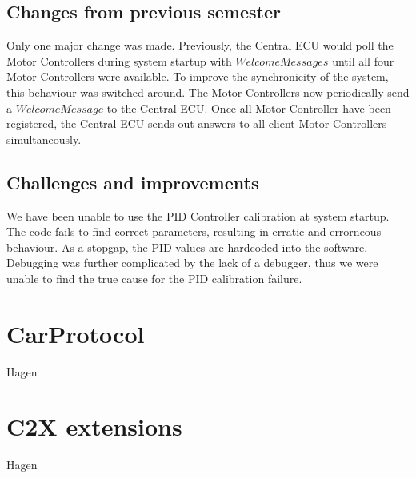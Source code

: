 \subsection{Changes from previous semester}
Only one major change was made. Previously, the Central ECU would poll the Motor Controllers during system startup with $WelcomeMessages$ until all four Motor Controllers were available. To improve the synchronicity of the system, this behaviour was switched around. The Motor Controllers now periodically send a $WelcomeMessage$ to the Central ECU. Once all Motor Controller have been registered, the Central ECU sends out answers to all client Motor Controllers simultaneously.

\subsection{Challenges and improvements}
We have been unable to use the PID Controller calibration at system startup. The code fails to find correct parameters, resulting in erratic and errorneous behaviour. As a stopgap, the PID values are hardcoded into the software. Debugging was further complicated by the lack of a debugger, thus we were unable to find the true cause for the PID calibration failure.

\section{CarProtocol}
Hagen

\section{C2X extensions}
Hagen

